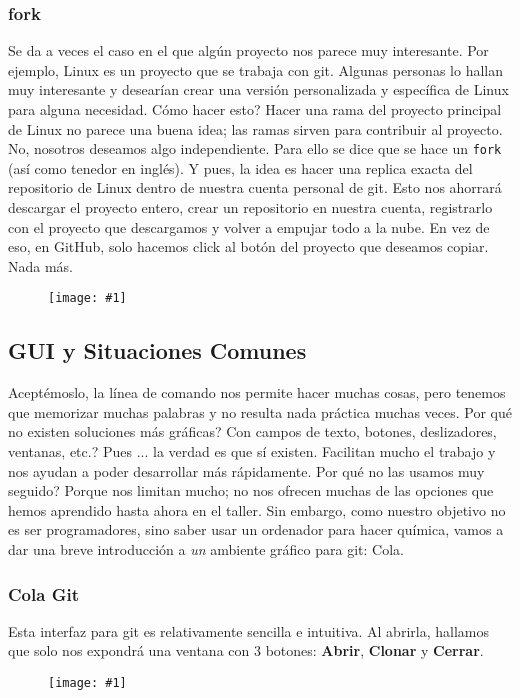 \documentclass[10pt,letterpaper]{article}
\newcommand{\inlinecode}[1]{
\colorbox{light-gray}{\texttt{#1}}
}
\newcommand{\Picture}[1]
{
	\begin{figure}[H]
	\begin{flushleft}
	\texttt{[image: \#1]}
	\end{flushleft}
	\end{figure}
}
\begin{document}
\subsubsection{fork}
Se da a veces el caso en el que alg\'un proyecto nos parece muy interesante. Por ejemplo, Linux es un proyecto que se trabaja con git. Algunas personas lo hallan muy interesante y desear\'ian crear una versi\'on personalizada y espec\'ifica de Linux para alguna necesidad. C\'omo hacer esto? Hacer una rama del proyecto principal de Linux no parece una buena idea; las ramas sirven para contribuir al proyecto. No, nosotros deseamos algo independiente. Para ello se dice que se hace un \inlinecode{fork} (as\'i como tenedor en ingl\'es). Y pues, la idea es hacer una replica exacta del repositorio de Linux dentro de nuestra cuenta personal de git. Esto nos ahorrar\'a descargar el proyecto entero, crear un repositorio en nuestra cuenta, registrarlo con el proyecto que descargamos y volver a empujar todo a la nube. En vez de eso, en GitHub, solo hacemos click al bot\'on del proyecto que deseamos copiar. Nada m\'as.

\Picture{img/fork.png}

\subsection{GUI y Situaciones Comunes}
Acept\'emoslo, la l\'inea de comando nos permite hacer muchas cosas, pero tenemos que memorizar muchas palabras y no resulta nada pr\'actica muchas veces. Por qu\'e no existen soluciones m\'as gr\'aficas? Con campos de texto, botones, deslizadores, ventanas, etc.? Pues ... la verdad es que s\'i existen. Facilitan mucho el trabajo y nos ayudan a poder desarrollar m\'as r\'apidamente. Por qu\'e no las usamos muy seguido? Porque nos limitan mucho; no nos ofrecen muchas de las opciones que hemos aprendido hasta ahora en el taller. Sin embargo, como nuestro objetivo no es ser programadores, sino saber usar un ordenador para hacer qu\'imica, vamos a dar una breve introducci\'on a \emph{un} ambiente gr\'afico para git: Cola.

\subsubsection{Cola Git}
Esta interfaz para git es relativamente sencilla e intuitiva. Al abrirla, hallamos que solo nos expondr\'a una ventana con 3 botones: \textbf{Abrir}, \textbf{Clonar} y \textbf{Cerrar}.

\Picture{img/cola1.png}
\end{document}
